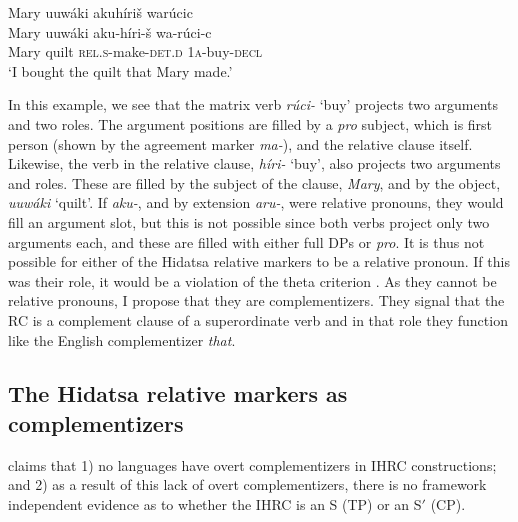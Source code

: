 \documentclass[output=paper]{LSP/langsci}
\begin{document}
\ea \label{boyle25}
 \glll Mary uuw\'aki akuh\'iri\v{s} war\'ucic\\
Mary uuw\'aki aku-h\'iri-\v{s}         wa-r\'uci-c\\
Mary quilt   \textsc{rel.s}-make-\textsc{det.d} \textsc{1a}-buy-\textsc{decl}\\
\trans `I bought the quilt that Mary made.' 
\z

In this example, we see that the matrix verb \textit{r\'uci-} `buy' projects two arguments and two  roles. The argument positions are filled by a \textit{pro} subject, which is first person (shown by the agreement marker \textit{ma-}), and the relative clause itself. Likewise, the verb in the relative clause, \textit{h\'iri-} `buy', also projects two arguments and  roles. These are filled by the subject of the clause, \textit{Mary}, and by the object, \textit{uuw\'aki} `quilt'. If \textit{aku-}, and by extension \textit{aru-}, were relative pronouns, they would fill an argument slot, but this is not possible since both verbs project only two arguments each, and these are filled with either full DPs or \textit{pro}. It is thus not possible for either of the Hidatsa relative markers to be a relative pronoun. If this was their role, it would be a violation of the theta criterion \citep[36]{Chomsky1981}. As they cannot be relative pronouns, I propose that they are complementizers. They signal that the RC is a complement clause of a superordinate verb and in that role they function like the English complementizer \textit{that}. 

\subsection{The Hidatsa relative markers as complementizers}\label{sec:boyle:5.2}

\citet{Culy1990} claims that 1) no languages have overt complementizers in IHRC constructions; and 2) as a result of this lack of overt complementizers, there is no framework independent evidence as to whether the IHRC is an S (TP) or an S$'$ (CP).  
\end{document}
